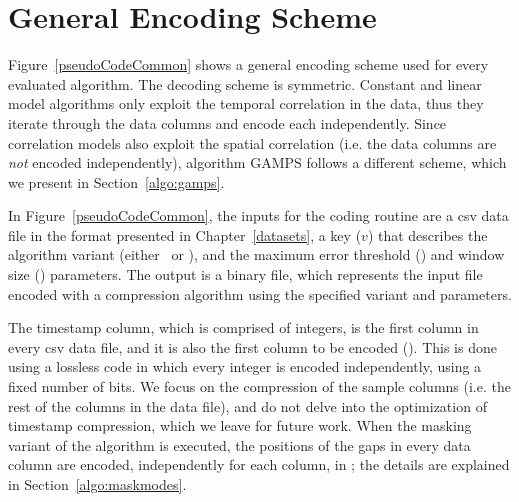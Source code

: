 

\vspace{-25pt}
\section{General Encoding Scheme}
\label{algo:details}


\vspace{-5pt}
Figure~\ref{pseudoCodeCommon} shows a general encoding scheme used for every evaluated algorithm. The decoding scheme is symmetric. Constant and linear model algorithms only exploit the temporal correlation in the data, thus they iterate through the data columns and encode each independently. Since correlation models also exploit the spatial correlation (i.e. the data columns are \textit{not} encoded independently), algorithm GAMPS follows a different scheme, which we present in Section~\ref{algo:gamps}.


In Figure~\ref{pseudoCodeCommon}, the inputs for the coding routine are a csv data file in the format presented in Chapter~\ref{datasets}, a key ($v$) that describes the algorithm variant (either \maskalgo\ or \NOmaskalgo), and the maximum error threshold (\maxerror) and window size (\win) parameters. The output is a binary file, which represents the input file encoded with a compression algorithm using the specified variant and parameters.


\vspace{+5pt}



The timestamp column, which is comprised of integers, is the first column in every csv data file, and it is also the first column to be encoded (). This is done using a lossless code in which every integer is encoded independently, using a fixed number of bits. We focus on the compression of the sample columns (i.e. the rest of the columns in the data file), and do not delve into the optimization of timestamp compression, which we leave for future work. When the masking variant of the algorithm is executed, the positions of the gaps in every data column are encoded, independently for each column, in ; the details are explained in Section~\ref{algo:maskmodes}. 

